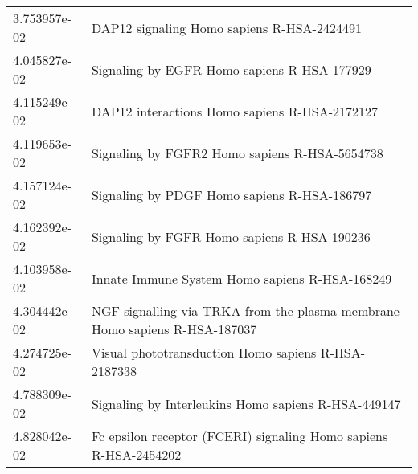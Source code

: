 \begin{longtable}{p{2.4cm}p{14.5cm}}
             3.753957e-02 &                                                    DAP12 signaling Homo sapiens R-HSA-2424491 \\
             4.045827e-02 &                                                   Signaling by EGFR Homo sapiens R-HSA-177929 \\
             4.115249e-02 &                                                 DAP12 interactions Homo sapiens R-HSA-2172127 \\
             4.119653e-02 &                                                 Signaling by FGFR2 Homo sapiens R-HSA-5654738 \\
             4.157124e-02 &                                                   Signaling by PDGF Homo sapiens R-HSA-186797 \\
             4.162392e-02 &                                                   Signaling by FGFR Homo sapiens R-HSA-190236 \\
             4.103958e-02 &                                                Innate Immune System Homo sapiens R-HSA-168249 \\
             4.304442e-02 &                    NGF signalling via TRKA from the plasma membrane Homo sapiens R-HSA-187037 \\
             4.274725e-02 &                                           Visual phototransduction Homo sapiens R-HSA-2187338 \\
             4.788309e-02 &                                           Signaling by Interleukins Homo sapiens R-HSA-449147 \\
             4.828042e-02 &                              Fc epsilon receptor (FCERI) signaling Homo sapiens R-HSA-2454202 \\
\end{longtable}



